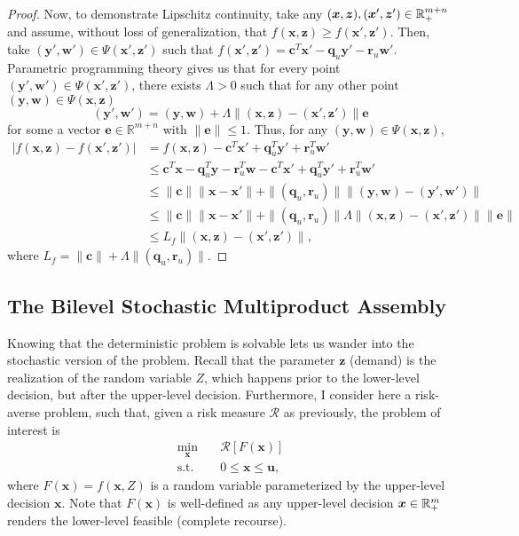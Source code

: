 \documentclass[12pt]{article}
\begin{document}
\begin{proof}
    Now, to demonstrate Lipschitz continuity, take any $(\bm{x},\bm{z}),(\bm{x}',\bm{z}') \in \mathbb{R}^{m+n}_{+}$ and assume, without loss of generalization, that $f(\bm{x},\bm{z})\ge f(\bm{x}',\bm{z}')$.
    Then, take $(\bm{y}',\bm{w}') \in \Psi(\bm{x}',\bm{z}')$ such that $f(\bm{x}',\bm{z}') =  \bm{c}^{T}\bm{x}' - \bm{q}_u \bm{y}' -\bm{r}_u \bm{w}'$.
    Parametric programming theory \citep[Lemma~4.1]{klatteErrorBoundsSolutions1995} gives us that for every point $(\bm{y}',\bm{w}')\in \Psi(\bm{x}',\bm{z}')$, there exists $\Lambda > 0$ such that for any other point $(\bm{y},\bm{w})\in \Psi(\bm{x},\bm{z})$ \[
	(\bm{y}',\bm{w}') = (\bm{y},\bm{w}) + \Lambda \| (\bm{x},\bm{z})-(\bm{x}',\bm{z}') \| \bm{e}
    \] for some a vector $\bm{e} \in \mathbb{R}^{m+n}$ with $\|\bm{e}\|\le 1$.
    Thus, for any $(\bm{y},\bm{w}) \in \Psi(\bm{x},\bm{z})$,
    \begin{align*}
	|f(\bm{x},\bm{z})-f(\bm{x}',\bm{z}')| &= f(\bm{x},\bm{z}) - \bm{c}^{T}\bm{x}' + \bm{q}_u^{T} \bm{y}' + \bm{r}_u^{T} \bm{w}' \\
			  &\le \bm{c}^{T} \bm{x} - \bm{q}_u^{T} \bm{y} - \bm{r}_u^{T} \bm{w}  - \bm{c}^{T}\bm{x}' + \bm{q}_u^{T} \bm{y}' + \bm{r}_u^{T} \bm{w}' \\
			  &\le  \|\bm{c}\| \|\bm{x}-\bm{x}'\| + \|(\bm{q}_u,\bm{r}_u)\| \|(\bm{y},\bm{w})-(\bm{y}',\bm{w}')\| \\
			  &\le  \|\bm{c}\| \|\bm{x}-\bm{x}'\| + \|(\bm{q}_u,\bm{r}_u)\| \Lambda\|(\bm{x},\bm{z})-(\bm{x}',\bm{z}')\| \|\bm{e}\| \\
			  &\le  L_f \|(\bm{x},\bm{z})-(\bm{x}',\bm{z}')\|
    ,\end{align*}
    where $L_f = \|\bm{c}\| + \Lambda \|(\bm{q}_u,\bm{r}_u)\|$.
\end{proof}

\subsection*{The Bilevel Stochastic Multiproduct Assembly}

Knowing that the deterministic problem is solvable lets us wander into the stochastic version of the problem.
Recall that the parameter $\bm{z}$ (demand) is the realization of the random variable $Z$, which happens prior to the lower-level decision, but after the upper-level decision.
Furthermore, I consider here a risk-averse problem, such that, given a risk measure $\mathcal{R}$ as previously, the problem of interest is
\begin{equation}\label{eq:multiprod-bis-prob}
\begin{split}
    \min_{\bm{x}} \quad & \mathcal{R}[F(\bm{x})] \\
    \textrm{s.t.} \quad & 0\le \bm{x}\le \bm{u}
,\end{split}
\end{equation}
where $F(\bm{x})=f(\bm{x},Z)$ is a random variable parameterized by the upper-level decision $\bm{x}$.
Note that $F(\bm{x})$ is well-defined as any upper-level decision $\bm{x}\in \mathbb{R}^{m}_{+}$ renders the lower-level feasible (complete recourse).
\end{document}
